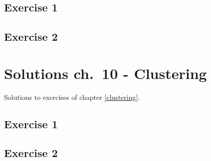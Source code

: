\documentclass[]{book}
\theoremstyle{definition}
\theoremstyle{definition}
\theoremstyle{definition}
\theoremstyle{remark}
\begin{document}
\section{Exercise 1}\label{exercise-1-6}

\section{Exercise 2}\label{exercise-2-6}

\chapter{Solutions ch.~10 - Clustering}\label{solutions-clustering}

Solutions to exercises of chapter \ref{clustering}.

\section{Exercise 1}\label{exercise-1-7}

\section{Exercise 2}\label{exercise-2-7}


\end{document}

